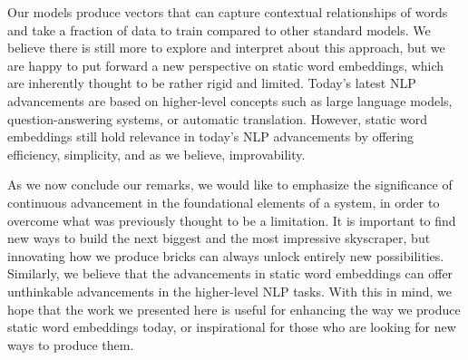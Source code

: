 Our models produce vectors that can capture contextual relationships of words and take a fraction of data to train compared to other standard models. We believe there is still more to explore and interpret about this approach, but we are happy to put forward a new perspective on static word embeddings, which are inherently thought to be rather rigid and limited. Today's latest \ac{NLP} advancements are based on higher-level concepts such as large language models, question-answering systems, or automatic translation. However, static word embeddings still hold relevance in today's NLP advancements by offering efficiency, simplicity, and as we believe, improvability.

As we now conclude our remarks, we would like to emphasize the significance of continuous advancement in the foundational elements of a system, in order to overcome what was previously thought to be a limitation. It is important to find new ways to build the next biggest and the most impressive skyscraper, but innovating how we produce bricks can always unlock entirely new possibilities. Similarly, we believe that the advancements in static word embeddings can offer unthinkable advancements in the higher-level \ac{NLP} tasks. With this in mind, we hope that the work we presented here is useful for enhancing the way we produce static word embeddings today, or inspirational for those who are looking for new ways to produce them.



